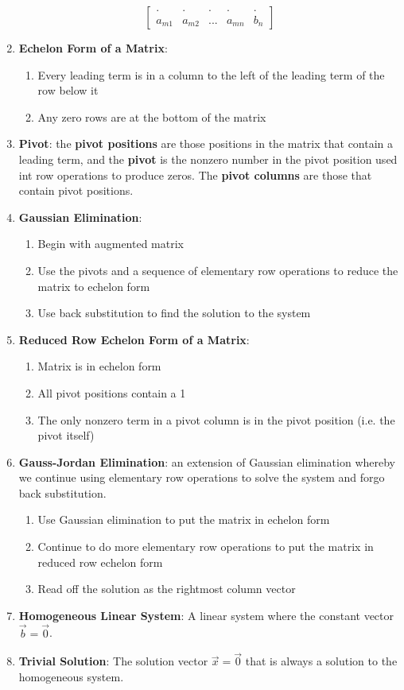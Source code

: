 \documentclass[10pt]{article}
\begin{document}
\begin{enumerate}
$$\begin{bmatrix}
. & . & . & . & . \\
a_{m1} & a_{m2} & ... & a_{mn} & b_n
\end{bmatrix}$$
\item \textbf{Echelon Form of a Matrix}: 
\begin{enumerate}
\item Every leading term is in a column to the left of the leading term of the row below it
\item Any zero rows are at the bottom of the matrix
\end{enumerate}
\item \textbf{Pivot}: the \textbf{pivot positions} are those positions in the matrix that contain a leading term, and the \textbf{pivot} is the nonzero number in the pivot position used int row operations to produce zeros. The \textbf{pivot columns} are those that contain pivot positions.
\item \textbf{Gaussian Elimination}:
\begin{enumerate}
\item Begin with augmented matrix
\item Use the pivots and a sequence of elementary row operations to reduce the matrix to echelon form
\item Use back substitution to find the solution to the system 
\end{enumerate}
\item \textbf{Reduced Row Echelon Form of a Matrix}:
\begin{enumerate}
\item Matrix is in echelon form
\item All pivot positions contain a 1
\item The only nonzero term in a pivot column is in the pivot position (i.e. the pivot itself)
\end{enumerate} 
\item \textbf{Gauss-Jordan Elimination}: an extension of Gaussian elimination whereby we continue using elementary row operations to solve the system and forgo back substitution.
\begin{enumerate}
\item Use Gaussian elimination to put the matrix in echelon form
\item Continue to do more elementary row operations to put the matrix in reduced row echelon form
\item Read off the solution as the rightmost column vector
\end{enumerate}
\item \textbf{Homogeneous Linear System}: A linear system where the constant vector $\vec{b} = \vec{0}$.
\item \textbf{Trivial Solution}: The solution vector $\vec{x} = \vec{0}$ that is always a solution to the homogeneous system.
\end{enumerate}
\end{document}
